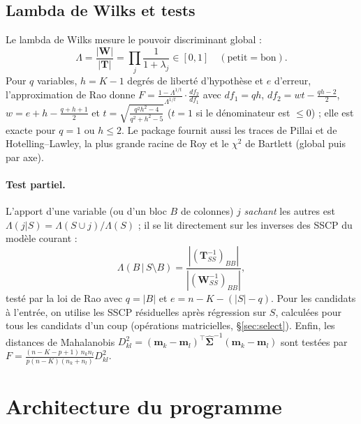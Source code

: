 \documentclass[10.5pt,a4paper]{article}
\newcommand{\bm}[1]{\mathbf{#1}}
\newcommand{\T}{^{\top}}
\begin{document}
\subsection{Lambda de Wilks et tests}
Le lambda de Wilks mesure le pouvoir discriminant global :
\begin{equation}
\Lambda=\frac{|\bm W|}{|\bm T|}=\prod_{j}\frac1{1+\lambda_j}\in[0,1]\quad(\text{petit}=\text{bon}).
\end{equation}
Pour $q$ variables, $h=K-1$ degr\'es de libert\'e d'hypoth\`ese et $e$ d'erreur, l'approximation de Rao donne $F=\frac{1-\Lambda^{1/t}}{\Lambda^{1/t}}\cdot\frac{df_2}{df_1}$ avec $df_1=qh$, $df_2=wt-\frac{qh-2}2$, $w=e+h-\frac{q+h+1}{2}$ et $t=\sqrt{\frac{q^2h^2-4}{q^2+h^2-5}}$ ($t=1$ si le d\'enominateur est $\le0$) ; elle est exacte pour $q=1$ ou $h\le2$. Le package fournit aussi les traces de Pillai et de Hotelling--Lawley, la plus grande racine de Roy et le $\chi^2$ de Bartlett (global puis par axe).

\paragraph{Test partiel.} L'apport d'une variable (ou d'un bloc $B$ de colonnes) $j$ \emph{sachant} les autres est $\Lambda(j|S)=\Lambda(S\cup j)/\Lambda(S)$ ; il se lit directement sur les inverses des SSCP du mod\`ele courant :
\begin{equation}
\Lambda(B\,|\,S\setminus B)=\frac{|(\bm T_{SS}^{-1})_{BB}|}{|(\bm W_{SS}^{-1})_{BB}|},
\end{equation}
test\'e par la loi de Rao avec $q=|B|$ et $e=n-K-(|S|-q)$. Pour les candidats \`a l'entr\'ee, on utilise les SSCP r\'esiduelles apr\`es r\'egression sur $S$, calcul\'ees pour tous les candidats d'un coup (op\'erations matricielles, \S\ref{sec:select}). Enfin, les distances de Mahalanobis $D^2_{kl}=(\bm m_k-\bm m_l)\T\hat{\bm\Sigma}^{-1}(\bm m_k-\bm m_l)$ sont test\'ees par $F=\frac{(n-K-p+1)\,n_kn_l}{p(n-K)(n_k+n_l)}D^2_{kl}$.

\section{Architecture du programme}\label{sec:archi}
\end{document}
